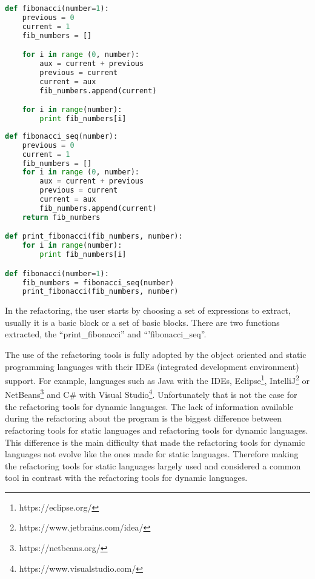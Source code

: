 \begin{lstlisting}[frame=single, caption=Fibonacci function first implementation, label={lst:Fibonnacci}, language=Python]
def fibonacci(number=1):
	previous = 0
	current = 1
	fib_numbers = []

	for i in range (0, number):
		aux = current + previous
		previous = current
		current = aux
		fib_numbers.append(current)

	for i in range(number):
		print fib_numbers[i]
\end{lstlisting}


\begin{lstlisting}[frame=single, caption=Fibonacci function after using extract function, label={lst:FibonnacciRefactored}, language=Python]
def fibonacci_seq(number):
	previous = 0
	current = 1
	fib_numbers = []
	for i in range (0, number):
		aux = current + previous
		previous = current
		current = aux
		fib_numbers.append(current)
	return fib_numbers

def print_fibonacci(fib_numbers, number):
	for i in range(number):
		print fib_numbers[i]

def fibonacci(number=1):
	fib_numbers = fibonacci_seq(number)
	print_fibonacci(fib_numbers, number)
\end{lstlisting}


In the refactoring, the user starts by choosing a set of expressions to extract, usually it is a  basic block or a set of basic blocks.
There are two functions extracted, the ``print\_fibonacci'' and ``'fibonacci\_seq''.

The use of the refactoring tools is fully adopted by the object oriented and static programming languages with their IDEs (integrated development environment) support.
For example, languages such as Java with the IDEs, Eclipse\footnote{https://eclipse.org/}, IntelliJ\footnote{https://www.jetbrains.com/idea/} or NetBeans\footnote{https://netbeans.org/} and C\# with Visual Studio\footnote{https://www.visualstudio.com/}.
Unfortunately that is not the case for the refactoring tools for dynamic languages. 
The lack of information available during the refactoring about the program is the biggest difference between refactoring tools for static languages and refactoring tools for dynamic languages.
This difference is the main difficulty that made the refactoring tools for dynamic languages not evolve like the ones made for static languages. 
Therefore making the refactoring tools for static languages largely used and considered a common tool in contrast with the refactoring tools for dynamic languages.  %

